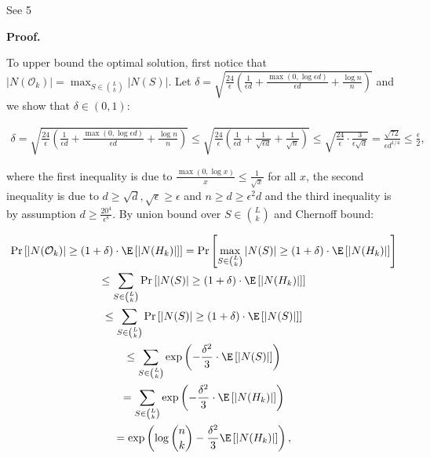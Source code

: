 See 5\par




\par\medskip\noindent\textbf{Proof.}\par



To upper bound the optimal solution, first notice that $|N(\mathcal{O}_{k})|=\max_{S\in\binom{L}{k}}|N(S)|$.
Let $\delta=\sqrt{\frac{24}{\epsilon}\left(\frac{1}{\epsilon d}+\frac{\max(0,\log{\epsilon d})}{\epsilon d}+\frac{\log{n}}{n}\right)}$ and we show that $\delta\in(0,1)$:\par


\[\begin{gathered}
\displaystyle\delta=\sqrt{\frac{24}{\epsilon}\left(\frac{1}{\epsilon d}+\frac{\max(0,\log{\epsilon d})}{\epsilon d}+\frac{\log{n}}{n}\right)}\leq\sqrt{\frac{24}{\epsilon}\left(\frac{1}{\epsilon d}+\frac{1}{\sqrt{\epsilon d}}+\frac{1}{\sqrt{n}}\right)}\leq\sqrt{\frac{24}{\epsilon}\cdot\frac{3}{\epsilon\sqrt{d}}}=\frac{\sqrt{72}}{\epsilon d^{1/4}}\leq\frac{\epsilon}{2},
\end{gathered}\]


where the first inequality is due to $\frac{\max(0,\log{x})}{x}\leq\frac{1}{\sqrt{x}}$ for all $x$, the second inequality is due to $d\geq\sqrt{d},\sqrt{\epsilon}\geq\epsilon$ and $n\geq d\geq\epsilon^{2}d$ and the third inequality is by assumption $d\geq\frac{20^{4}}{\epsilon^{8}}$.
By union bound over $S\in\binom{L}{k}$ and Chernoff bound:\par


\[\begin{gathered}
\displaystyle\Pr\left[|N(\mathcal{O}_{k})|\geq(1+\delta)\cdot\E\left[|N(H_{k})|\right]\right] \displaystyle=\Pr\left[\max_{S\in\binom{L}{k}}|N(S)|\geq(1+\delta)\cdot\E\left[|N(H_{k})|\right]\right] \\
\displaystyle\leq\sum_{S\in\binom{L}{k}}\Pr\left[|N(S)|\geq(1+\delta)\cdot\E\left[|N(H_{k})|\right]\right] \\
\displaystyle\leq\sum_{S\in\binom{L}{k}}\Pr\left[|N(S)|\geq(1+\delta)\cdot\E\left[|N(S)|\right]\right] \\
\displaystyle\leq\sum_{S\in\binom{L}{k}}\exp\left(-\frac{\delta^{2}}{3}\cdot\E\left[|N(S)|\right]\right) \\
\displaystyle=\sum_{S\in\binom{L}{k}}\exp\left(-\frac{\delta^{2}}{3}\cdot\E\left[|N(H_{k})|\right]\right) \\
\displaystyle=\exp\left(\log{\binom{n}{k}}-\frac{\delta^{2}}{3}\E\left[|N(H_{k})|\right]\right),
\end{gathered}\]


